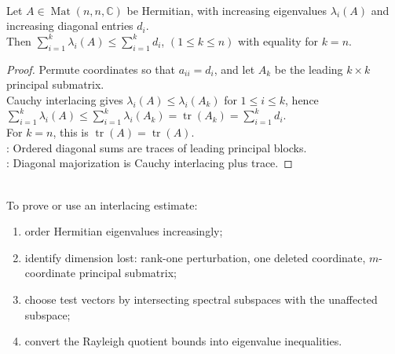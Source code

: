 \begin{theorem} \label{thm:schur-majorization-eigenvalues-by-diagonal} \\
Let $A\in\operatorname{Mat}(n,n,\mathbb{C})$ be Hermitian, with increasing eigenvalues $\lambda_i(A)$ and increasing diagonal entries $d_i$.\\
Then $\sum\limits_{i=1}^{k}\lambda_i(A)\leq \sum\limits_{i=1}^{k}d_i$, $(1\leq k\leq n)$ with equality for $k=n$.
\begin{proof}
Permute coordinates so that $a_{ii}=d_i$, and let $A_k$ be the leading $k\times k$ principal submatrix.\\
Cauchy interlacing gives $\lambda_i(A)\leq\lambda_i(A_k)$ for $1\leq i\leq k$, hence $\sum\limits_{i=1}^{k}\lambda_i(A)\leq\sum\limits_{i=1}^{k}\lambda_i(A_k)=\operatorname{tr}(A_k)=\sum\limits_{i=1}^{k}d_i$.\\
For $k=n$, this is $\operatorname{tr}(A)=\operatorname{tr}(A)$.\\
: Ordered diagonal sums are traces of leading principal blocks.\\
: Diagonal majorization is Cauchy interlacing plus trace.
\end{proof}
\end{theorem}

\begin{method} \label{meth:eigenvalue-interlacing-method} \\
To prove or use an interlacing estimate:
\begin{enumerate}[label=(\roman*)]
\setlength{\itemsep}{0pt}
\item order Hermitian eigenvalues increasingly;
\item identify dimension lost: rank-one perturbation, one deleted coordinate, $m$-coordinate principal submatrix;
\item choose test vectors by intersecting spectral subspaces with the unaffected subspace;
\item convert the Rayleigh quotient bounds into eigenvalue inequalities.
\end{enumerate}
\end{method}
